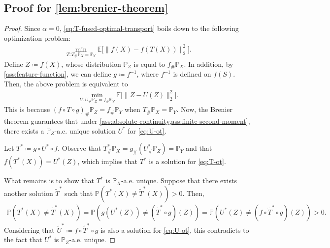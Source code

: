 \documentclass{article}
\begin{document}
\subsection{Proof for \cref{lem:brenier-theorem}}

\begin{proof}
	Since $\alpha = 0$, \eqref{eq:T-fused-optimal-transport} boils down to the following optimization problem:
	\begin{align}
		\label{eq:T-ot}
		\min_{T: T_{\#}\mathbb{P}_X = \mathbb{P}_Y} \mathbb{E}\Big[\|f(X) - f(T(X))\|_2^2\Big] .
	\end{align}
	Define $Z \coloneqq f(X)$, whose distribution $\mathbb{P}_Z$ is equal to $f_{\#}\mathbb{P}_X$. In addition, by \cref{ass:feature-function}, we can define $g \coloneqq f^{-1}$, where $f^{-1}$ is defined on $f(S)$. Then, the above problem is equivalent to
	\begin{align}
		\label{eq:U-ot}
		\min_{U: U_{\#}\mathbb{P}_Z = f_{\#}\mathbb{P}_Y} \mathbb{E}\Big[\|Z - U(Z)\|_2^2\Big] .
	\end{align}
	This is because $(f \circ T \circ g)_{\#}\mathbb{P}_Z = f_{\#}\mathbb{P}_Y$ when $T_{\#}\mathbb{P}_X = \mathbb{P}_Y$. Now, the Brenier theorem guarantees that under \cref{ass:absolute-continuity,ass:finite-second-moment}, there exists a $\mathbb{P}_Z$-a.e. unique solution $U^\ast$ for \eqref{eq:U-ot}.
	
	Let $T^\ast \coloneqq g \circ U^\ast \circ f$. Observe that $T^\ast_{\#}\mathbb{P}_X = g_{\#}(U^\ast_{\#}\mathbb{P}_Z) = \mathbb{P}_Y$ and that $f(T^\ast(X)) = U^\ast(Z)$, which implies that $T^\ast$ is a solution for \eqref{eq:T-ot}.
	
	What remains is to show that $T^\ast$ is $\mathbb{P}_X$-a.e. unique. Suppose that there exists another solution $\tilde{T}^\ast$ such that $\mathbb{P}(T^\ast(X) \neq \tilde{T}^\ast(X)) > 0$. Then,
	\begin{align*}
		\mathbb{P}(T^\ast(X) \neq \tilde{T}^\ast(X)) = \mathbb{P}(g(U^\ast(Z)) \neq (\tilde{T}^\ast \circ g)(Z)) = \mathbb{P}(U^\ast(Z) \neq (f \circ \tilde{T}^\ast \circ g)(Z)) > 0 .
	\end{align*}
	Considering that $\tilde{U}^\ast \coloneqq f \circ \tilde{T}^\ast \circ g$ is also a solution for \eqref{eq:U-ot}, this contradicts to the fact that $U^\ast$ is $\mathbb{P}_Z$-a.e. unique.
\end{proof}
\end{document}
